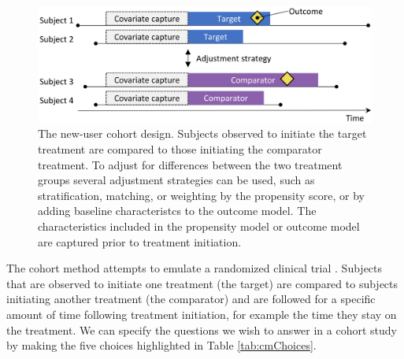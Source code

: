 \documentclass[11pt]{book}
\theoremstyle{definition}
\theoremstyle{definition}
\theoremstyle{definition}
\theoremstyle{remark}
\begin{document}
\begin{figure}

{\centering \includegraphics[width=0.9\linewidth]{images/PopulationLevelEstimation/cohortMethod} 

}

\caption{The new-user cohort design. Subjects observed to initiate the target treatment are compared to those initiating the comparator treatment. To adjust for differences between the two treatment groups several adjustment strategies can be used, such as stratification, matching, or weighting by the propensity score, or by adding baseline characteristcs to the outcome model. The characteristics included in the propensity model or outcome model are captured prior to treatment initiation.}\label{fig:cohortMethod}
\end{figure}

The cohort method attempts to emulate a randomized clinical trial \citep{hernan_2016}. Subjects that are observed to initiate one treatment (the target) are compared to subjects initiating another treatment (the comparator) and are followed for a specific amount of time following treatment initiation, for example the time they stay on the treatment. We can specify the questions we wish to answer in a cohort study by making the five choices highlighted in Table \ref{tab:cmChoices}.   
\end{document}
